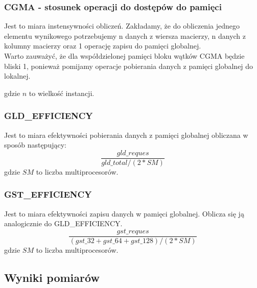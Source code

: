 \documentclass[10pt,a4paper]{article}
\begin{document}
\subsubsection*{CGMA - stosunek operacji do dostępów do pamięci}
Jest to miara instensywności obliczeń. Zakładamy, że do obliczenia jednego elementu
wynikowego potrzebujemy n danych z wiersza macierzy, n danych z kolumny macierzy
oraz 1 operację zapisu do pamięci globalnej.\\
Warto zauważyć, że dla współdzielonej pamięci bloku wątków CGMA będzie bliski 1,
ponieważ pomijamy operacje pobierania danych z pamięci globalnej do lokalnej.

gdzie $n$ to wielkość instancji.

\subsubsection*{GLD\_EFFICIENCY}
Jest to miara efektywności pobierania danych z pamięci globalnej obliczana w sposób
następujący:
\begin{equation}
	\frac{gld\_reques}{gld\_total / (2*SM)}
\end{equation}
gdzie $SM$ to liczba multiprocesorów.

\subsubsection*{GST\_EFFICIENCY}
Jest to miara efektywności zapisu danych w pamięci globalnej.
Oblicza się ją analogicznie
do GLD\_EFFICIENCY.
\begin{equation}
	\frac{gst\_reques}{(gst\_32 + gst\_64 + gst\_128) / (2*SM)}
\end{equation}
gdzie $SM$ to liczba multiprocesorów.

\subsection{Wyniki pomiarów}

\begin{table}


\end{table}
\end{document}
